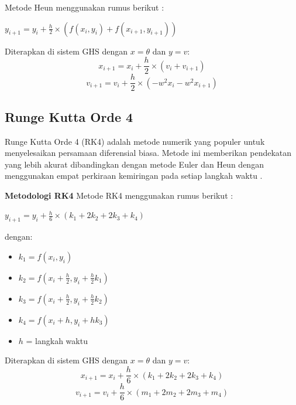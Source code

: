 \noindent
Metode Heun menggunakan rumus berikut \cite{heun_method}:
\begin{center}
    $y_{i + 1} = y_i + \frac{h}{2} \times (f(x_i, y_i) + f(x_{i + 1}, y_{i + 1}))$
\end{center}

\noindent
Diterapkan di sistem GHS dengan $x = \theta$ dan $y = v$:  
$$x_{i + 1} = x_i + \frac{h}{2} \times (v_i + v_{i + 1})$$
$$v_{i + 1} = v_i + \frac{h}{2} \times (-w^2x_i - w^2x_{i + 1})$$

\subsection{Runge Kutta Orde 4}
Runge Kutta Orde 4 (RK4) adalah metode numerik yang populer untuk menyelesaikan persamaan diferensial biasa.
Metode ini memberikan pendekatan yang lebih akurat dibandingkan dengan metode Euler dan Heun
dengan menggunakan empat perkiraan kemiringan pada setiap langkah waktu \cite{runge_kutta_method}.  

\vspace{0.3em}
\noindent       
\textbf{Metodologi RK4}
\noindent
Metode RK4 menggunakan rumus berikut \cite{runge_kutta_method}:
\begin{center}
    $y_{i + 1} = y_i + \frac{h}{6} \times (k_1 + 2k_2 + 2k_3 + k_4)$
\end{center}

\noindent
dengan: 
\begin{itemize}
    \item $k_1 = f(x_i, y_i)$
    \item $k_2 = f(x_i + \frac{h}{2}, y_i + \frac{h}{2}k_1)$
    \item $k_3 = f(x_i + \frac{h}{2}, y_i + \frac{h}{2}k_2)$
    \item $k_4 = f(x_i + h, y_i + hk_3)$
    \item $h$ = langkah waktu
\end{itemize}       
\noindent
Diterapkan di sistem GHS dengan $x = \theta$ dan $y = v$:  
$$x_{i + 1} = x_i + \frac{h}{6} \times (k_1 + 2k_2 + 2k_3 + k_4)$$
$$v_{i + 1} = v_i + \frac{h}{6} \times (m_1 + 2m_2 + 2m_3 + m_4)$$